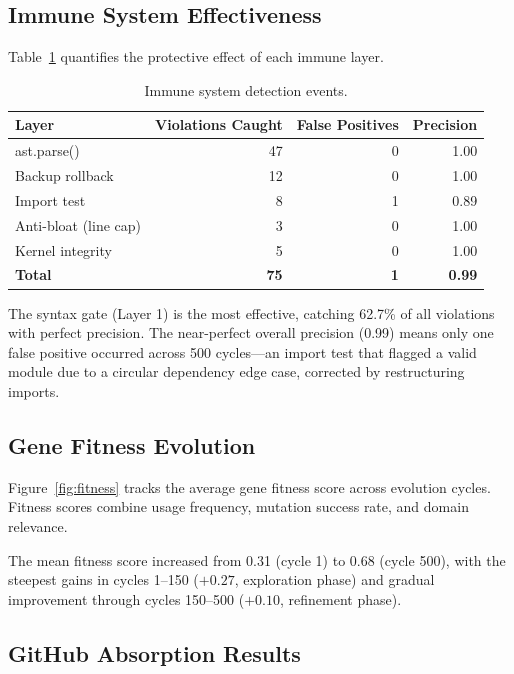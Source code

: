 \documentclass[11pt,a4paper]{article}
\begin{document}
\subsection{Immune System Effectiveness}

Table~\ref{tab:immune} quantifies the protective effect of each immune layer.

\begin{table}[H]
\centering
\begin{tabular}{@{}lrrr@{}}
\toprule
\textbf{Layer} & \textbf{Violations Caught} & \textbf{False Positives} & \textbf{Precision} \\
\midrule
ast.parse() & 47 & 0 & 1.00 \\
Backup rollback & 12 & 0 & 1.00 \\
Import test & 8 & 1 & 0.89 \\
Anti-bloat (line cap) & 3 & 0 & 1.00 \\
Kernel integrity & 5 & 0 & 1.00 \\
\midrule
\textbf{Total} & \textbf{75} & \textbf{1} & \textbf{0.99} \\
\bottomrule
\end{tabular}
\caption{Immune system detection events.}
\label{tab:immune}
\end{table}

The syntax gate (Layer 1) is the most effective, catching 62.7\% of all violations with perfect precision. The near-perfect overall precision (0.99) means only one false positive occurred across 500 cycles—an import test that flagged a valid module due to a circular dependency edge case, corrected by restructuring imports.

\subsection{Gene Fitness Evolution}

Figure~\ref{fig:fitness} tracks the average gene fitness score across evolution cycles. Fitness scores combine usage frequency, mutation success rate, and domain relevance.


The mean fitness score increased from 0.31 (cycle 1) to 0.68 (cycle 500), with the steepest gains in cycles 1--150 ($+0.27$, exploration phase) and gradual improvement through cycles 150--500 ($+0.10$, refinement phase).

\subsection{GitHub Absorption Results}
\end{document}
